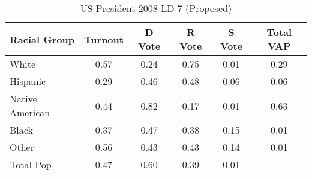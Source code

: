 \begin{table}[htb]
\begin{center}
\caption{US President 2008 LD 7 (Proposed)}
\label{pres08_vap_ld_7}
\begin{tabular}{lccccc}
  \hline
Racial Group & Turnout & D Vote & R Vote & S Vote & Total VAP \\ 
  \hline
White & 0.57 & 0.24 & 0.75 & 0.01 & 0.29 \\ 
  Hispanic & 0.29 & 0.46 & 0.48 & 0.06 & 0.06 \\ 
  Native American & 0.44 & 0.82 & 0.17 & 0.01 & 0.63 \\ 
  Black & 0.37 & 0.47 & 0.38 & 0.15 & 0.01 \\ 
  Other & 0.56 & 0.43 & 0.43 & 0.14 & 0.01 \\ 
  Total Pop & 0.47 & 0.60 & 0.39 & 0.01 &  \\ 
   \hline
\end{tabular}
\end{center}
\end{table}
